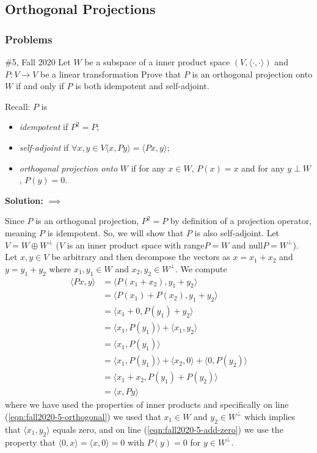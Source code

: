\documentclass{article}
\begin{document}
\subsection{Orthogonal Projections} 

\subsubsection{Problems}

\begin{problem}{\#5, Fall 2020} Let $W$ be a subspace of a inner product space $(V, \langle \cdot, \cdot \rangle)$ and $P: V\to V$ be a linear transformation Prove that $P$ is an orthogonal projection onto $W$ if and only if $P$ is both idempotent and self-adjoint.

Recall: $P$ is 
	\begin{itemize}
		\item \textit{idempotent} if $P^2 = P$;
		\item \textit{self-adjoint} if $\forall x, y \in V \langle x, Py \rangle = \langle Px , y \rangle$;
		\item \textit{orthogonal projection onto} $W$ if for any $x\in W$, $P(x) = x$ and for any $y \perp W$, $P(y) = 0$.
	\end{itemize}
\end{problem}


\textbf{Solution:} $\implies$

Since $P$ is an orthogonal projection, $P^2 = P$ by definition of a projection operator, meaning $P$ is idempotent. So, we will show that $P$ is also self-adjoint. Let $V = W \oplus W^\perp$ ($V$ is an inner product space with range$P=W$ and null$P = W^\perp$). Let $x,y\in V$ be arbitrary and then decompose the vectors as $x = x_1 + x_2$ and $y = y_1 + y_2$ where $x_1,y_1\in W$ and $x_2, y_2\in W^\perp$. We compute
	\begin{align}
		\langle Px, y\rangle & = \langle P(x_1+x_2), y_1 + y_2 \rangle \nonumber \\
					      & = \langle P(x_1) + P(x_2), y_1 + y_2 \rangle \nonumber \\
					      & = \langle x_1 + 0, P(y_1) + y_2 \rangle \nonumber \\
					      & = \langle x_1, P(y_1) \rangle + \langle x_1, y_2 \rangle \nonumber \\
					      & = \langle x_1, P(y_1) \rangle \label{eqn:fall2020-5-orthogonal} \\ 
					      & = \langle x_1, P(y_1) \rangle + \langle x_2, 0\rangle + \langle 0, P(y_2) \rangle \label{eqn:fall2020-5-add-zero} \\
					      & = \langle x_1 + x_2, P(y_1) + P(y_2) \rangle \nonumber \\
					      & = \langle x, Py \rangle \nonumber
	\end{align}
where we have used the properties of inner products and specifically on line (\ref{eqn:fall2020-5-orthogonal}) we used that $x_1\in W$ and $y_2\in W^\perp$ which implies that $\langle x_1, y_2 \rangle$ equals zero, and on line (\ref{eqn:fall2020-5-add-zero}) we use the property that $\langle 0, x\rangle = \langle x , 0 \rangle = 0$ with $P(y) = 0$ for $y\in W^\perp$. 
\end{document}
